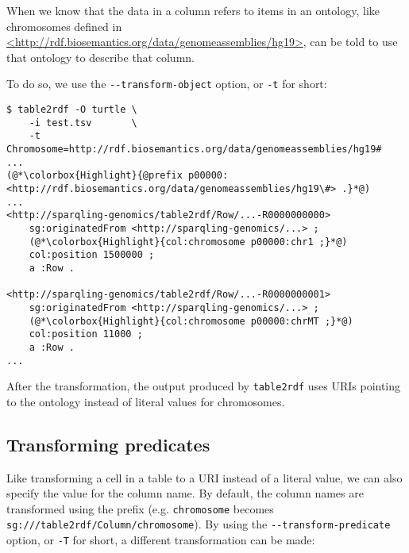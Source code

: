   \begin{sloppypar}
  When we know that the data in a column refers to items in an ontology, like
  chromosomes defined in
  \href{http://rdf.biosemantics.org/data/genomeassemblies/hg19}%
  {<http://rdf.biosemantics.org/data/genomeassemblies/hg19>}, 
  can be told to use that ontology to describe that column.
  \end{sloppypar}

  To do so, we use the \texttt{-{}-transform-object} option, or \texttt{-t}
  for short:

\begin{siderules}
\begin{lstlisting}
$ table2rdf -O turtle \
    -i test.tsv       \
    -t Chromosome=http://rdf.biosemantics.org/data/genomeassemblies/hg19#
...
(@*\colorbox{Highlight}{@prefix p00000: <http://rdf.biosemantics.org/data/genomeassemblies/hg19\#> .}*@)
...
<http://sparqling-genomics/table2rdf/Row/...-R0000000000>
    sg:originatedFrom <http://sparqling-genomics/...> ;
    (@*\colorbox{Highlight}{col:chromosome p00000:chr1 ;}*@)
    col:position 1500000 ;
    a :Row .

<http://sparqling-genomics/table2rdf/Row/...-R0000000001>
    sg:originatedFrom <http://sparqling-genomics/...> ;
    (@*\colorbox{Highlight}{col:chromosome p00000:chrMT ;}*@)
    col:position 11000 ;
    a :Row .
...
\end{lstlisting}
\end{siderules}

  After the transformation, the output produced by \texttt{table2rdf} uses
  URIs pointing to the ontology instead of literal values for chromosomes.

\subsection{Transforming predicates}

  Like transforming a cell in a table to a URI instead of a literal value,
  we can also specify the value for the column name.  By default, the column
  names are transformed using the \tablerdf{Column/} prefix (e.g.
  \texttt{chromosome} becomes
  \texttt{sg://\sgversion{}/table2rdf/Column/chromosome}).  By using
  the \texttt{-{}-transform-predicate} option, or \texttt{-T} for short, a
  different transformation can be made:

